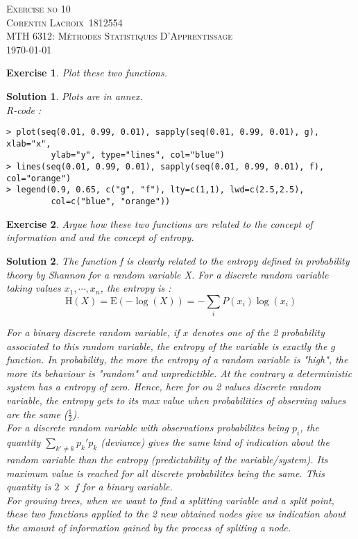 \documentclass[12pt,a4paper]{article}
\def\StudentName{Corentin Lacroix}
\def\StudentMatricule{1812554}
\def\ExerciseNo{10}
\newtheorem{exercise}{Exercise}
\newtheorem{solution}{Solution}
\begin{document}
\begin{titlepage}
\begin{center}
\textsc{\LARGE Exercise no \ExerciseNo}\\[1.5cm]
\vspace{2in}
\textsc{\Large \StudentName~\StudentMatricule}\\[0.5cm]
\textsc{MTH 6312: Méthodes Statistiques D'Apprentissage}\\[0.5cm]
\today
\end{center}
\end{titlepage}

\begin{exercise}
Plot these two functions.
\end{exercise}
\begin{solution}
Plots are in annex.\\
R-code : 
\begin{verbatim}
> plot(seq(0.01, 0.99, 0.01), sapply(seq(0.01, 0.99, 0.01), g), xlab="x",
		 ylab="y", type="lines", col="blue")
> lines(seq(0.01, 0.99, 0.01), sapply(seq(0.01, 0.99, 0.01), f), col="orange")
> legend(0.9, 0.65, c("g", "f"), lty=c(1,1), lwd=c(2.5,2.5), 
		 col=c("blue", "orange"))
\end{verbatim}
\end{solution}

\begin{exercise}
Argue how these two functions are related to the concept of information and and the concept of entropy.
\end{exercise}
\begin{solution}
The function f is clearly related to the entropy defined in probability theory by Shannon for a random variable X. For a discrete random variable taking values $x_1, \cdots, x_n$, the entropy is : $$\mathrm{H}(X) = \mathrm{E}(-\log(X)) = -\sum_i P(x_i)\log(x_i)$$

For a binary discrete random variable, if $x$ denotes one of the 2 probability associated to this random variable, the entropy of the variable is exactly the $g$ function. In probability, the more the entropy of a random variable is "high", the more its behaviour is "random" and unpredictible. At the contrary a deterministic system has a entropy of zero. Hence, here for ou 2 values discrete random variable, the entropy gets to its max value when probabilities of observing values are the same ($\frac{1}{2}$).\\

For a discrete random variable with observations probabilites being $p_i$, the quantity $\sum_{k'\neq k} p_k' p_k$ (deviance) gives the same kind of indication about the random variable than the entropy (predictability of the variable/system). Its maximum value is reached for all discrete probabilites being the same. This quantity is $2\ \times \ f$ for a binary variable.\\

For growing trees, when we want to find a splitting variable and a split point, these two functions applied to the 2 new obtained nodes give us indication about the amount of information gained by the process of spliting a node.    
\end{solution}
\end{document}
